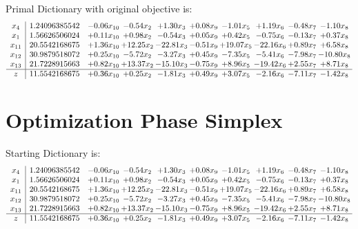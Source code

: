 \documentclass[9pt]{article}
\begin{document}
Primal Dictionary with original objective is:
\[\begin{array}{c| c c@{\hskip 2pt} c@{\hskip 2pt} c@{\hskip 2pt} c@{\hskip 2pt} c@{\hskip 2pt} c@{\hskip 2pt} c@{\hskip 2pt} c@{\hskip 2pt} }
 x_{4}   &  1.24096385542 & -0.06 x_{10} & -0.54 x_{2} & +  1.30 x_{3} & +  0.08 x_{9} & -1.01 x_{5} & +  1.19 x_{6} & -0.48 x_{7} & -1.10 x_{8}\\
 x_{1}   &  1.56626506024 & +  0.11 x_{10} & +  0.98 x_{2} & -0.54 x_{3} & +  0.05 x_{9} & +  0.42 x_{5} & -0.75 x_{6} & -0.13 x_{7} & +  0.37 x_{8}\\
 x_{11}   &  20.5542168675 & +  1.36 x_{10} & + 12.25 x_{2} & -22.81 x_{3} & -0.51 x_{9} & + 19.07 x_{5} & -22.16 x_{6} & +  0.89 x_{7} & +  6.58 x_{8}\\
 x_{12}   &  30.9879518072 & +  0.25 x_{10} & -5.72 x_{2} & -3.27 x_{3} & +  0.45 x_{9} & -7.35 x_{5} & -5.41 x_{6} & -7.98 x_{7} & -10.80 x_{8}\\
 x_{13}   &  21.7228915663 & +  0.82 x_{10} & + 13.37 x_{2} & -15.10 x_{3} & -0.75 x_{9} & +  8.96 x_{5} & -19.42 x_{6} & +  2.55 x_{7} & +  8.71 x_{8}\\
\hline
z    &  11.5542168675 & +  0.36 x_{10} & +  0.25 x_{2} & -1.81 x_{3} & +  0.49 x_{9} & +  3.07 x_{5} & -2.16 x_{6} & -7.11 x_{7} & -1.42 x_{8}\\
\end{array}\]
\section{Optimization Phase Simplex}
Starting Dictionary is:
\[\begin{array}{c| c c@{\hskip 2pt} c@{\hskip 2pt} c@{\hskip 2pt} c@{\hskip 2pt} c@{\hskip 2pt} c@{\hskip 2pt} c@{\hskip 2pt} c@{\hskip 2pt} }
 x_{4}   &  1.24096385542 & -0.06 x_{10} & -0.54 x_{2} & +  1.30 x_{3} & +  0.08 x_{9} & -1.01 x_{5} & +  1.19 x_{6} & -0.48 x_{7} & -1.10 x_{8}\\
 x_{1}   &  1.56626506024 & +  0.11 x_{10} & +  0.98 x_{2} & -0.54 x_{3} & +  0.05 x_{9} & +  0.42 x_{5} & -0.75 x_{6} & -0.13 x_{7} & +  0.37 x_{8}\\
 x_{11}   &  20.5542168675 & +  1.36 x_{10} & + 12.25 x_{2} & -22.81 x_{3} & -0.51 x_{9} & + 19.07 x_{5} & -22.16 x_{6} & +  0.89 x_{7} & +  6.58 x_{8}\\
 x_{12}   &  30.9879518072 & +  0.25 x_{10} & -5.72 x_{2} & -3.27 x_{3} & +  0.45 x_{9} & -7.35 x_{5} & -5.41 x_{6} & -7.98 x_{7} & -10.80 x_{8}\\
 x_{13}   &  21.7228915663 & +  0.82 x_{10} & + 13.37 x_{2} & -15.10 x_{3} & -0.75 x_{9} & +  8.96 x_{5} & -19.42 x_{6} & +  2.55 x_{7} & +  8.71 x_{8}\\
\hline
z    &  11.5542168675 & +  0.36 x_{10} & +  0.25 x_{2} & -1.81 x_{3} & +  0.49 x_{9} & +  3.07 x_{5} & -2.16 x_{6} & -7.11 x_{7} & -1.42 x_{8}\\
\end{array}\]
\end{document}
